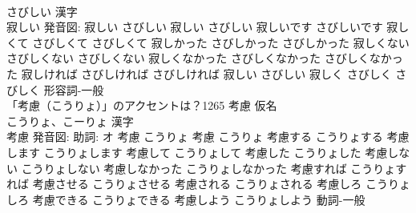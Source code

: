 \documentclass[8pt]{extreport}
\begin{document}
\begin{CJK}{UTF8}{min}
\\	さびしい 漢字　
\\	寂しい 発音図:	寂しい さびしい		寂しい さびしい 寂しいです さびしいです 寂しくて さびしくて さびしくて 寂しかった さびしかった さびしかった 寂しくない さびしくない さびしくない 寂しくなかった さびしくなかった さびしくなかった 寂しければ さびしければ さびしければ 寂しい さびしい 寂しく さびしく さびしく				形容詞-一般 
\\	「考慮（こうりょ）」のアクセントは？1265	考慮 仮名　
\\	こうりょ、こーりょ 漢字　
\\	考慮 発音図: 助詞: オ	考慮 こうりょ		考慮 こうりょ 考慮する こうりょする 考慮します こうりょします 考慮して こうりょして 考慮した こうりょした 考慮しない こうりょしない 考慮しなかった こうりょしなかった 考慮すれば こうりょすれば 考慮させる こうりょさせる 考慮される こうりょされる 考慮しろ こうりょしろ 考慮できる こうりょできる 考慮しよう こうりょしよう				動詞-一般 
\end{CJK}
\end{document}

